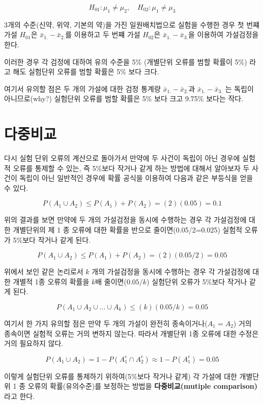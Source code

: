\documentclass[
]{book}
\begin{document}
\[ H_{01}: \mu_1 \ne \mu_2, \quad H_{02}: \mu_1 \ne \mu_3 \]

3개의 수준(신약, 위약, 기본의 약)을 가진 일원배치법으로 실험을 수행한
경우 첫 번쨰 가설 \(H_{01}\)은 \({\bar x}_{1.} - {\bar x}_{2.}\)를 이용하고
두 번쨰 가설 \(H_{02}\)은 \({\bar x}_{1.} - {\bar x}_{3.}\)을 이용하여
가설검정을 한다.

이러한 경우 각 검정에 대하여 유의 수준을 5\% (개별단위 오류를 범할 확률이
5\%) 라고 해도 실험단위 오류를 범할 확률은 5\% 보다 크다.

여기서 유의할 점은 두 개의 가설에 대한 검정 통계량
\({\bar x}_{1.} - {\bar x}_{2.}\)과 \({\bar x}_{1.} - {\bar x}_{3.}\) 는
독립이 아니므로(why?) 실험단위 오류를 범할 확률은 5\% 보다 크고 9.75\%
보다는 작다.

\hypertarget{uxb2e4uxc911uxbe44uxad50}{%
\section{다중비교}\label{uxb2e4uxc911uxbe44uxad50}}

다시 실험 단위 오류의 계산으로 돌아가서 만약에 두 사건이 독립이 아닌
경우에 실험적 오류를 통제할 수 있는, 즉 5\%보다 작거나 같게 하는 방법에
대해서 알아보자 두 사건이 독립이 아닌 일반적인 경우에 확률 공식을
이용하여 다음과 같은 부등식을 얻을 수 있다.

\[ P( A_1 \cup A_2 )  \le  P( A_1 ) + P( A_2 ) = (2)(0.05) = 0.1 \]

위의 결과를 보면 만약에 두 개의 가설검정을 동시에 수행하는 경우 각
가설검정에 대한 개별단위의 제 1 종 오류에 대한 확률을 반으로
줄이면(0.05/2=0.025) 실험적 오류가 5\%보다 작거나 같게 된다.

\[ P( A_1 \cup A_2 )  \le  P( A_1 ) + P( A_2 ) = (2)(0.05/2) = 0.05 \]

위에서 보인 같은 논리로서 \(k\) 개의 가설검정을 동시에 수행하는 경우 각
가설검정에 대한 개별적 1종 오류의 확률을 \(k\)배 줄이면(\(0.05/k\)) 실험단위
오류가 5\%보다 작거나 같게 된다.

\[ P( A_1 \cup A_2 \cup ... \cup A_k )  \le   (k)(0.05/k) = 0.05 \]

여기서 한 가지 유의할 점은 만약 두 개의 가설이 완전히
종속이거나(\(A_1 = A_2\)) 거의 종속이면 실험적 오류는 거의 변하지 않는다.
따라서 개별단위 1종 오류에 대한 수정은 거의 필요하지 않다.

\[ P( A_1 \cup A_2 ) = 1- P(A_1^c \cap A^c_2 ) \approx 1-P(A_1^c) = 0.05 \]

이렇게 실험단위 오류를 통제하기 위하여(5\%보다 작거나 같게) 각 가설에
대한 개별단위 1 종 오류의 확률(유의수준)를 보정하는 방법을
\textbf{다중비교(mutiple comparison)} 라고 한다.
\end{document}
